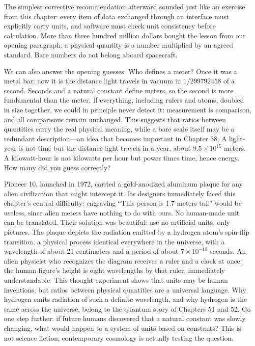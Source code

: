 The simplest corrective recommendation afterward sounded just like an exercise from this chapter: every item of data exchanged through an interface must explicitly carry units, and software must check unit consistency before calculation. More than three hundred million dollars bought the lesson from our opening paragraph: a physical quantity is a number multiplied by an agreed standard. Bare numbers do not belong aboard spacecraft.

We can also answer the opening guesses. Who defines a meter? Once it was a metal bar; now it is the distance light travels in vacuum in $1/299792458$ of a second. Seconds and a natural constant define meters, so the second is more fundamental than the meter. If everything, including rulers and atoms, doubled in size together, we could in principle never detect it: measurement is comparison, and all comparisons remain unchanged. This suggests that ratios between quantities carry the real physical meaning, while a bare scale itself may be a redundant description---an idea that becomes important in Chapter 38. A light-year is not time but the distance light travels in a year, about $9.5\times10^{15}$ meters. A kilowatt-hour is not kilowatts per hour but power times time, hence energy. How many did you guess correctly?


\begin{thought}
Pioneer 10, launched in 1972, carried a gold-anodized aluminum plaque for any alien civilization that might intercept it. Its designers immediately faced this chapter's central difficulty: engraving ``This person is 1.7 meters tall'' would be useless, since alien meters have nothing to do with ours. No human-made unit can be translated. Their solution was beautiful: use no artificial units, only pictures. The plaque depicts the radiation emitted by a hydrogen atom's spin-flip transition, a physical process identical everywhere in the universe, with a wavelength of about 21 centimeters and a period of about $7\times10^{-10}$ seconds. An alien physicist who recognizes the diagram receives a ruler and a clock at once: the human figure's height is eight wavelengths by that ruler, immediately understandable. This thought experiment shows that units may be human inventions, but ratios between physical quantities are a universal language. Why hydrogen emits radiation of such a definite wavelength, and why hydrogen is the same across the universe, belong to the quantum story of Chapters 51 and 52. Go one step further: if future humans discovered that a natural constant was slowly changing, what would happen to a system of units based on constants? This is not science fiction; contemporary cosmology is actually testing the question.
\end{thought}

